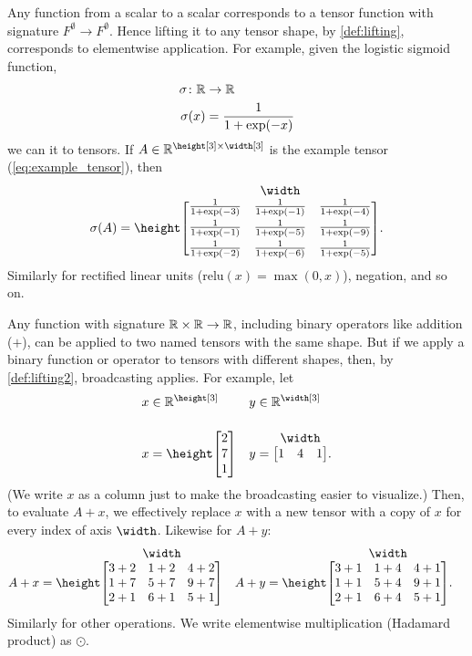 Any function from a scalar to a scalar corresponds to a tensor function with signature $F^{\emptyset} \rightarrow F^{\emptyset}$. 
Hence lifting it to any tensor shape, by \cref{def:lifting}, corresponds to elementwise application. 
For example, given the logistic sigmoid function,
\begin{align*}
  \sigma \colon \mathbb{R} &\rightarrow \mathbb{R} \\
  \sigma(x) &= \frac{1}{1+\exp(-x)}
\end{align*}  
we can \liftVB{} it to tensors. If $A \in \reals^{\height[3] \times \width[3]}$ is the example tensor (\ref{eq:example_tensor}), then
\begin{equation*}
\sigma(A) = \nmatrix{\height}{\width}{
  \frac1{1+\exp(-3)} & \frac1{1+\exp(-1)} & \frac1{1+\exp(-4)} \\[1ex]
  \frac1{1+\exp(-1)} & \frac1{1+\exp(-5)} & \frac1{1+\exp(-9)} \\[1ex]
  \frac1{1+\exp(-2)} & \frac1{1+\exp(-6)} & \frac1{1+\exp(-5)}
}.
\end{equation*}
Similarly for rectified linear units ($\text{relu}(x) = \max(0, x)$), negation, and so on.

Any function with signature $\mathbb{R} \times \mathbb{R} \rightarrow \mathbb{R}$, including binary operators like addition ($\mathord+$), can be applied to two named tensors with the same shape.
But if we apply a binary function or operator to tensors with different shapes, then, by \cref{def:lifting2}, broadcasting applies. For example, let
\begin{align*}
  x &\in \reals^{\height[3]} & y &\in \reals^{\width[3]} \\
  x &= \nmatrix{\height}{}{
    2 \\ 7 \\ 1
  } & 
  y &= \nmatrix{}{\width}{
    1 & 4 & 1
  }.
\end{align*}
(We write $x$ as a column just to make the broadcasting easier to visualize.) Then, to evaluate $A+x$, we effectively replace $x$ with a new tensor with a copy of $x$ for every index of axis $\width$. Likewise for $A+y$:
\begin{align*}
A + x &= \nmatrix{\height}{\width}{
  3+2 & 1+2 & 4+2 \\
  1+7 & 5+7 & 9+7 \\
  2+1 & 6+1 & 5+1
} &
A + y &= \nmatrix{\height}{\width}{
  3+1 & 1+4 & 4+1 \\
  1+1 & 5+4 & 9+1 \\
  2+1 & 6+4 & 5+1
}.
\end{align*}
Similarly for other operations. We write elementwise multiplication (Hadamard product) as $\odot$.

